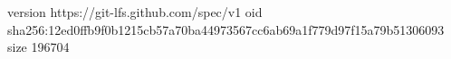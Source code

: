 version https://git-lfs.github.com/spec/v1
oid sha256:12ed0ffb9f0b1215cb57a70ba44973567cc6ab69a1f779d97f15a79b51306093
size 196704
